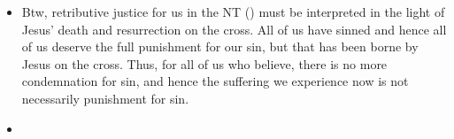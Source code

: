 \begin{itemize}
{  view of retributive justice, especially in our fallen world where Satan is
  active. }
  \item{Btw, retributive justice for us in the NT () must
  be interpreted in the light of Jesus' death and resurrection on the cross.
  All of us have sinned and hence all of us deserve the full punishment for
  our sin, but that has been borne by Jesus on the cross. Thus, for all of us
  who believe, there is no more condemnation for sin, and hence the suffering
  we experience now is not necessarily punishment for sin. }
  \item{ }
\end{itemize}